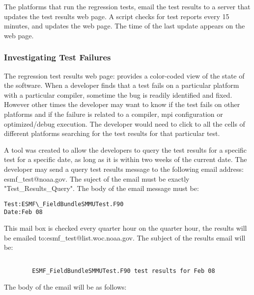 The platforms that run the regression tests, email the test results to a server that updates the test results web page. A script checks for test reports every 15 minutes, and updates the web page. The time of the last update appears on the web page.

\subsubsection{Investigating Test Failures}
The regression test results web page:  provides a color-coded view of the state of the software.
When a developer finds that a test fails on a particular platform with a particular compiler, sometime the bug is readily identified and fixed.
However other times the developer may want to know if the test fails on other platforms and if the failure is related to a compiler, mpi configuration or optimized/debug execution.
The developer would need to click to all the cells of different platforms searching for the test results for that particular test.

A tool was created to allow the developers to query the test results for a specific test for a specific date, as long as it is within two weeks of the current date.
The developer may send a query test results message to the following email address: esmf\_test@noaa.gov.
The suject of the email must be exactly "Test\_Results\_Query". The body of the email message must be:

\begin{verbatim}
Test:ESMF\_FieldBundleSMMUTest.F90
Date:Feb 08
\end{verbatim}

This mail box is checked every quarter hour on the quarter hour, the results will be emailed to:esmf\_test@list.woc.noaa.gov.
The subject of the results email will be:
\begin{verbatim}

        ESMF_FieldBundleSMMUTest.F90 test results for Feb 08

\end{verbatim}

The body of the email will be as follows:

